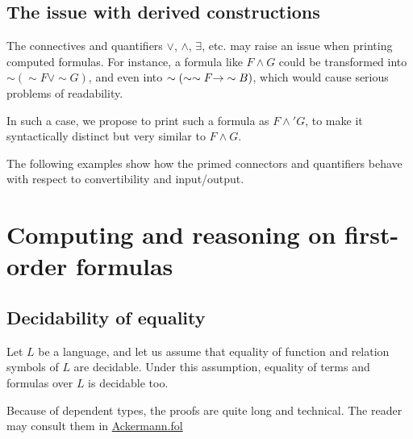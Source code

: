 

\subsection{The issue with derived constructions}
\label{sect:fol-issue}


The connectives and quantifiers $\vee$, $\wedge$, $\exists$, etc. may raise an issue when printing computed formulas.
For instance, a formula like $F \wedge G$ could be transformed into $\sim(\sim F \vee \sim G)$,  and even
into $\sim(\sim\sim F \mbox{$\rightarrow$} \sim B)$, which would 
cause serious problems of readability.

In such a case, we propose to print such a formula as $F \wedge' G$, to make it syntactically distinct but very similar to $F \wedge G$.


The following examples show how the primed connectors 
and quantifiers behave with respect to convertibility and 
input/output.














\section{Computing and reasoning on first-order formulas}



\subsection{Decidability of equality}

Let $L$ be a language, and let us assume that equality 
of function and relation symbols of $L$ are decidable.
Under this assumption, equality of terms and formulas over $L$ is decidable too.

Because of dependent types, the proofs are quite long and technical. The reader may consult them in \href{../theories/html/hydras.Ackermann.fol.html}{Ackermann.fol}



